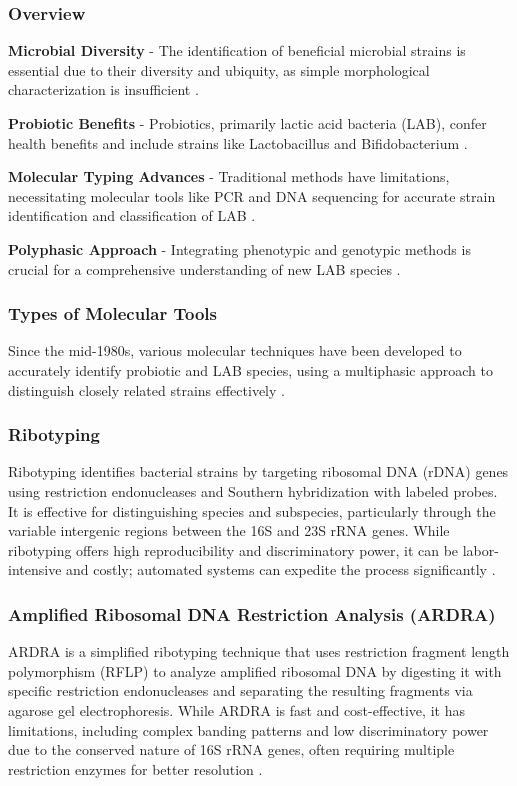 \subsubsection*{Overview}
\textbf{Microbial Diversity} - The identification of beneficial microbial strains is essential due to their diversity and ubiquity, as simple morphological characterization is insufficient \cite*{L4-MolTyping}.

\textbf{Probiotic Benefits} - Probiotics, primarily lactic acid bacteria (LAB), confer health benefits and include strains like Lactobacillus and Bifidobacterium \cite*{L4-MolTyping}.

\textbf{Molecular Typing Advances} - Traditional methods have limitations, necessitating molecular tools like PCR and DNA sequencing for accurate strain identification and classification of LAB \cite*{L4-MolTyping}.

\textbf{Polyphasic Approach} - Integrating phenotypic and genotypic methods is crucial for a comprehensive understanding of new LAB species \cite*{L4-MolTyping}.

\subsubsection*{Types of Molecular Tools}
Since the mid-1980s, various molecular techniques have been developed to accurately identify probiotic and LAB species, using a multiphasic approach to distinguish closely related strains effectively \cite*{L4-MolTyping}.

\subsubsection{Ribotyping}
Ribotyping identifies bacterial strains by targeting ribosomal DNA (rDNA) genes using restriction endonucleases and Southern hybridization with labeled probes. It is effective for distinguishing species and subspecies, particularly through the variable intergenic regions between the 16S and 23S rRNA genes. While ribotyping offers high reproducibility and discriminatory power, it can be labor-intensive and costly; automated systems can expedite the process significantly \cite*{L4-MolTyping}.

\subsubsection{Amplified Ribosomal DNA Restriction Analysis (ARDRA)}
ARDRA is a simplified ribotyping technique that uses restriction fragment length polymorphism (RFLP) to analyze amplified ribosomal DNA by digesting it with specific restriction endonucleases and separating the resulting fragments via agarose gel electrophoresis. While ARDRA is fast and cost-effective, it has limitations, including complex banding patterns and low discriminatory power due to the conserved nature of 16S rRNA genes, often requiring multiple restriction enzymes for better resolution \cite*{L4-MolTyping}.

